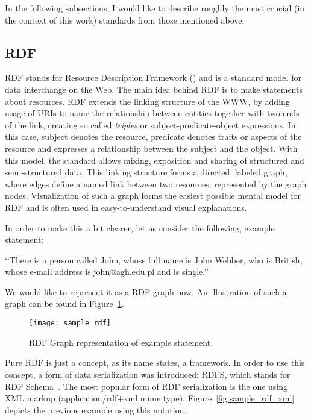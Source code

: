 In the following subsections, I would like to describe roughly the most crucial (in the context of this work) standards from those mentioned above.

\subsection{RDF}

RDF stands for Resource Description Framework (\cite{rdfPrimer:2004}) and is a standard model for data interchange on the Web. The main idea behind RDF is to make statements about resources. RDF extends the linking structure of the WWW, by adding usage of URIs to name the relationship between entities together with two ends of the link, creating so called \emph{triples} or subject-predicate-object expressions. In this case, subject denotes the resource, predicate denotes traits or aspects of the resource and expresses a relationship between the subject and the object. With this model, the standard allows mixing, exposition and sharing of structured and semi-structured data. This linking structure forms a directed, labeled graph, where edges define a named link between two resources, represented by the graph nodes. Visualization of such a graph forms the easiest possible mental model for RDF and is often used in easy-to-understand visual explanations.

In order to make this a bit clearer, let us consider the following, example statement:

\lq\lq{}There is a person called John, whose full name is John Webber, who is British, whose e-mail address is john@agh.edu.pl and is single.\rq\rq{}

We would like to represent it as a RDF graph now. An illustration of such a graph can be found in Figure~\ref{fig:sample_rdf}.

\begin{figure}[ht]
	\centering
	\texttt{[image: sample\_rdf]}
	\caption{RDF Graph representation of example statement.}
	\label{fig:sample_rdf}
\end{figure}

Pure RDF is just a concept, as its name states, a framework. In order to use this concept, a form of data serialization was introduced: RDFS, which stands for RDF Schema~\cite{rdfRef:2004}. The most popular form of RDF serialization is the one using XML markup (application/rdf+xml mime type). Figure~\ref{fig:sample_rdf_xml} depicts the previous example using this notation.

